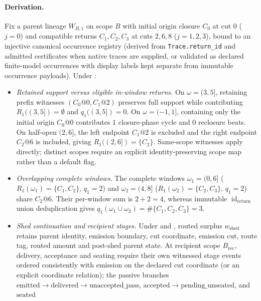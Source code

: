 \paragraph{Derivation.}
Fix a parent lineage \(W_{B,1}\) on scope \(B\) with initial origin closure
\(C_0\) at cut \(0\) (\(j=0\)) and compatible returns \(C_1,C_2,C_3\) at cuts
\(2,6,8\) (\(j=1,2,3\)), bound to an injective canonical occurrence registry
(derived from \texttt{Trace.return\_id} and admitted certificates when native
traces are supplied, or validated as declared finite-model occurrences with
display labels kept separate from immutable occurrence payloads). Under
:
\begin{itemize}[leftmargin=1.6em,itemsep=2pt]
\item \emph{Retained support versus eligible in-window returns.} On
\(\omega=(3,5]\), retaining prefix witnesses \((C_0@0,C_1@2)\) preserves full
support while contributing \(R_1((3,5])=\emptyset\) and \(q_1((3,5])=0\). On
\(\omega=(-1,1]\), containing only the initial origin \(C_0@0\) contributes
\(1\) closure-phase cycle and \(0\) reclosure beats. On half-open \((2,6]\),
the left endpoint \(C_1@2\) is excluded and the right endpoint \(C_2@6\) is
included, giving \(R_1((2,6])=\{C_2\}\). Same-scope witnesses apply directly;
distinct scopes require an explicit identity-preserving scope map rather than a
default flag.
\item \emph{Overlapping complete windows.} The complete windows
\(\omega_1=(0,6]\) (\(R_1(\omega_1)=\{C_1,C_2\}\), \(q_1=2\)) and
\(\omega_2=(4,8]\) (\(R_1(\omega_2)=\{C_2,C_3\}\), \(q_1=2\)) share
\(C_2@6\). Their per-window sum is \(2+2=4\), whereas immutable
\(\operatorname{id}_{\mathrm{return}}\) union deduplication gives
\(q_1(\omega_1\cup\omega_2)=\#\{C_1,C_2,C_3\}=3\).
\item \emph{Shed continuation and recipient stages.} Under
 and
, routed surplus \(w_{\mathrm{shed}}\)
retains parent identity, emission boundary, cut coordinate, emission cut, route
tag, routed amount and post-shed parent state. At recipient scope
\(B_{\mathrm{rec}}\), delivery, acceptance and seating require their own
witnessed stage events ordered consistently with emission on the declared cut
coordinate (or an explicit coordinate relation); the passive branches
\(\mathrm{emitted}\to\mathrm{delivered}\to\mathrm{unaccepted\_pass}\),
\(\mathrm{accepted}\to\mathrm{pending\_unseated}\), and \(\mathrm{seated}\)

\end{itemize}
